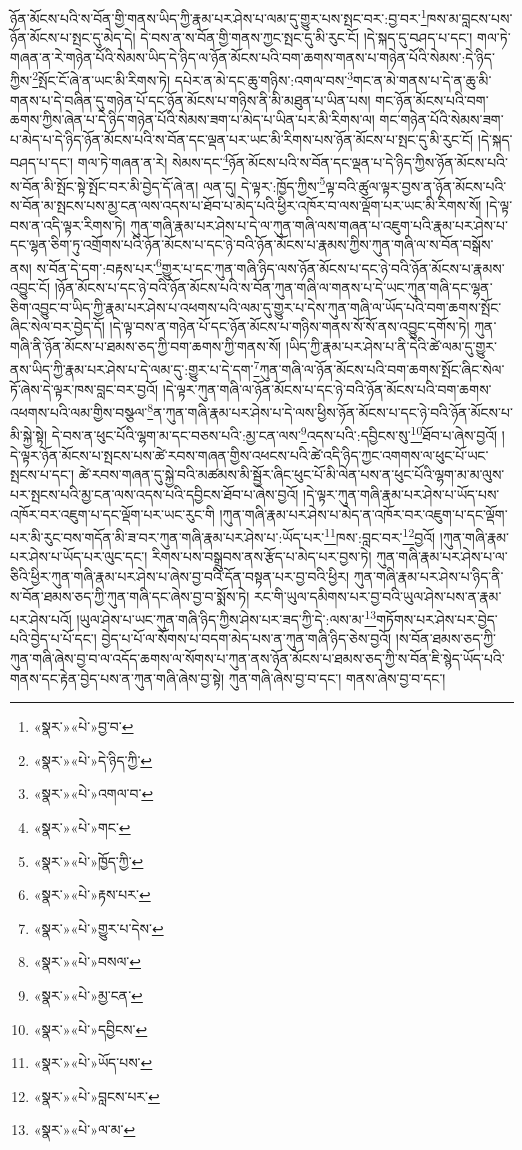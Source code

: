 ཉོན་མོངས་པའི་ས་བོན་གྱི་གནས་ཡིད་ཀྱི་རྣམ་པར་ཤེས་པ་ལམ་དུ་གྱུར་པས་སྤང་བར་:བྱ་བར་\footnote{«སྣར་»«པེ་»བྱ་བ་}ཁས་མ་བླངས་པས་ཉོན་མོངས་པ་སྤང་དུ་མེད་དེ། དེ་བས་ན་ས་བོན་གྱི་གནས་ཀྱང་སྤང་དུ་མི་རུང་ངོ། །དེ་སྐད་དུ་བཤད་པ་དང་། གལ་ཏེ་གཞན་ན་རེ་གཉེན་པོའི་སེམས་ཡིད་དེ་ཉིད་ལ་ཉོན་མོངས་པའི་བག་ཆགས་གནས་པ་གཉེན་པོའི་སེམས་:དེ་ཉིད་ཀྱིས་\footnote{«སྣར་»«པེ་»དེ་ཉིད་ཀྱི་}སྤོང་ངོ་ཞེ་ན་ཡང་མི་རིགས་ཏེ། དཔེར་ན་མེ་དང་ཆུ་གཉིས་:འགལ་བས་\footnote{«སྣར་»«པེ་»འགལ་བ་}གང་ན་མེ་གནས་པ་དེ་ན་ཆུ་མི་གནས་པ་དེ་བཞིན་དུ་གཉེན་པོ་དང་ཉོན་མོངས་པ་གཉིས་ནི་མི་མཐུན་པ་ཡིན་པས། གང་ཉོན་མོངས་པའི་བག་ཆགས་ཀྱིས་ཞེན་པ་དེ་ཉིད་གཉེན་པོའི་སེམས་ཟག་པ་མེད་པ་ཡིན་པར་མི་རིགས་ལ། གང་གཉེན་པོའི་སེམས་ཟག་པ་མེད་པ་དེ་ཉིད་ཉོན་མོངས་པའི་ས་བོན་དང་ལྡན་པར་ཡང་མི་རིགས་པས་ཉོན་མོངས་པ་སྤང་དུ་མི་རུང་ངོ། །དེ་སྐད་བཤད་པ་དང་། གལ་ཏེ་གཞན་ན་རེ། སེམས་དང་\footnote{«སྣར་»«པེ་»གང་}ཉོན་མོངས་པའི་ས་བོན་དང་ལྡན་པ་དེ་ཉིད་ཀྱིས་ཉོན་མོངས་པའི་ས་བོན་མི་སྤོང་སྟེ་སྤོང་བར་མི་བྱེད་དོ་ཞེ་ན། ལན་དུ། དེ་ལྟར་:ཁྱོད་ཀྱིས་\footnote{«སྣར་»«པེ་»ཁྱོད་ཀྱི་}ལྟ་བའི་ཚུལ་ལྟར་བྱས་ན་ཉོན་མོངས་པའི་ས་བོན་མ་སྤངས་པས་མྱ་ངན་ལས་འདས་པ་ཐོབ་པ་མེད་པའི་ཕྱིར་འཁོར་བ་ལས་ལྡོག་པར་ཡང་མི་རིགས་སོ། །དེ་ལྟ་བས་ན་འདི་ལྟར་རིགས་ཏེ། ཀུན་གཞི་རྣམ་པར་ཤེས་པ་དེ་ལ་ཀུན་གཞི་ལས་གཞན་པ་འཇུག་པའི་རྣམ་པར་ཤེས་པ་དང་ལྷན་ཅིག་ཏུ་འགྲོགས་པའི་ཉོན་མོངས་པ་དང་ཉེ་བའི་ཉོན་མོངས་པ་རྣམས་ཀྱིས་ཀུན་གཞི་ལ་ས་བོན་བསྒོས་ནས། ས་བོན་དེ་དག་:བརྟས་པར་\footnote{«སྣར་»«པེ་»རྟས་པར་}གྱུར་པ་དང་ཀུན་གཞི་ཉིད་ལས་ཉོན་མོངས་པ་དང་ཉེ་བའི་ཉོན་མོངས་པ་རྣམས་འབྱུང་ངོ། །ཉོན་མོངས་པ་དང་ཉེ་བའི་ཉོན་མོངས་པའི་ས་བོན་ཀུན་གཞི་ལ་གནས་པ་དེ་ཡང་ཀུན་གཞི་དང་ལྷན་ཅིག་འབྱུང་བ་ཡིད་ཀྱི་རྣམ་པར་ཤེས་པ་འཕགས་པའི་ལམ་དུ་གྱུར་པ་དེས་ཀུན་གཞི་ལ་ཡོད་པའི་བག་ཆགས་སྤོང་ཞིང་སེལ་བར་བྱེད་དོ། །དེ་ལྟ་བས་ན་གཉེན་པོ་དང་ཉོན་མོངས་པ་གཉིས་གནས་སོ་སོ་ནས་འབྱུང་དགོས་ཏེ། ཀུན་གཞི་ནི་ཉོན་མོངས་པ་ཐམས་ཅད་ཀྱི་བག་ཆགས་ཀྱི་གནས་སོ། །ཡིད་ཀྱི་རྣམ་པར་ཤེས་པ་ནི་དེའི་ཚེ་ལམ་དུ་གྱུར་ནས་ཡིད་ཀྱི་རྣམ་པར་ཤེས་པ་དེ་ལམ་དུ་:གྱུར་པ་དེ་དག་\footnote{«སྣར་»«པེ་»གྱུར་པ་དེས་}ཀུན་གཞི་ལ་ཉོན་མོངས་པའི་བག་ཆགས་སྤོང་ཞིང་སེལ་ཏོ་ཞེས་དེ་ལྟར་ཁས་བླང་བར་བྱའོ། །དེ་ལྟར་ཀུན་གཞི་ལ་ཉོན་མོངས་པ་དང་ཉེ་བའི་ཉོན་མོངས་པའི་བག་ཆགས་འཕགས་པའི་ལམ་གྱིས་བསྩལ་\footnote{«སྣར་»«པེ་»བསལ་}ན་ཀུན་གཞི་རྣམ་པར་ཤེས་པ་དེ་ལས་ཕྱིས་ཉོན་མོངས་པ་དང་ཉེ་བའི་ཉོན་མོངས་པ་མི་སྐྱེ་སྟེ། དེ་བས་ན་ཕུང་པོའི་ལྷག་མ་དང་བཅས་པའི་:མྱ་ངན་ལས་\footnote{«སྣར་»«པེ་»མྱ་ངན་}འདས་པའི་:དབྱིངས་སུ་\footnote{«སྣར་»«པེ་»དབྱིངས་}ཐོབ་པ་ཞེས་བྱའོ། །དེ་ལྟར་ཉོན་མོངས་པ་སྤངས་པས་ཚེ་རབས་གཞན་གྱིས་འཕངས་པའི་ཚེ་འདི་ཉིད་ཀྱང་འགགས་ལ་ཕུང་པོ་ཡང་སྤངས་པ་དང་། ཚེ་རབས་གཞན་དུ་སྐྱེ་བའི་མཚམས་མི་སྦྱོར་ཞིང་ཕུང་པོ་མི་ལེན་པས་ན་ཕུང་པོའི་ལྷག་མ་མ་ལུས་པར་སྤངས་པའི་མྱ་ངན་ལས་འདས་པའི་དབྱིངས་ཐོབ་པ་ཞེས་བྱའོ། །དེ་ལྟར་ཀུན་གཞི་རྣམ་པར་ཤེས་པ་ཡོད་པས་འཁོར་བར་འཇུག་པ་དང་ལྡོག་པར་ཡང་རུང་གི །ཀུན་གཞི་རྣམ་པར་ཤེས་པ་མེད་ན་འཁོར་བར་འཇུག་པ་དང་ལྡོག་པར་མི་རུང་བས་གདོན་མི་ཟ་བར་ཀུན་གཞི་རྣམ་པར་ཤེས་པ་:ཡོད་པར་\footnote{«སྣར་»«པེ་»ཡོད་པས་}ཁས་:བླང་བར་\footnote{«སྣར་»«པེ་»བླངས་པར་}བྱའོ། །ཀུན་གཞི་རྣམ་པར་ཤེས་པ་ཡོད་པར་ལུང་དང་། རིགས་པས་བསྒྲུབས་ནས་རྩོད་པ་མེད་པར་བྱས་ཏེ། ཀུན་གཞི་རྣམ་པར་ཤེས་པ་ལ་ཅིའི་ཕྱིར་ཀུན་གཞི་རྣམ་པར་ཤེས་པ་ཞེས་བྱ་བའི་དོན་བསྟན་པར་བྱ་བའི་ཕྱིར། ཀུན་གཞི་རྣམ་པར་ཤེས་པ་ཉིད་ནི་ས་བོན་ཐམས་ཅད་ཀྱི་ཀུན་གཞི་དང་ཞེས་བྱ་བ་སྨོས་ཏེ། རང་གི་ཡུལ་དམིགས་པར་བྱ་བའི་ཡུལ་ཤེས་པས་ན་རྣམ་པར་ཤེས་པའོ། །ཡུལ་ཤེས་པ་ཡང་ཀུན་གཞི་ཉིད་ཀྱིས་ཤེས་པར་ཟད་ཀྱི་དེ་:ལས་མ་\footnote{«སྣར་»«པེ་»ལ་མ་}གཏོགས་པར་ཤེས་པར་བྱེད་པའི་བྱེད་པ་པོ་དང་། བྱེད་པ་པོ་ལ་སོགས་པ་བདག་མེད་པས་ན་ཀུན་གཞི་ཉིད་ཅེས་བྱའོ། །ས་བོན་ཐམས་ཅད་ཀྱི་ཀུན་གཞི་ཞེས་བྱ་བ་ལ་འདོད་ཆགས་ལ་སོགས་པ་ཀུན་ནས་ཉོན་མོངས་པ་ཐམས་ཅད་ཀྱི་ས་བོན་ཇི་སྙེད་ཡོད་པའི་གནས་དང་རྟེན་བྱེད་པས་ན་ཀུན་གཞི་ཞེས་བྱ་སྟེ། ཀུན་གཞི་ཞེས་བྱ་བ་དང་། གནས་ཞེས་བྱ་བ་དང་། 